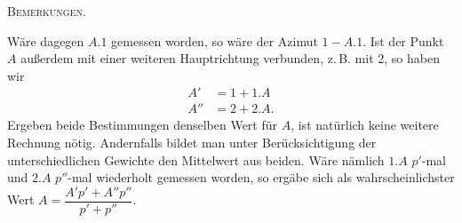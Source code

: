 \begingroup
\newcommand{\IXarc}[1]{\overset{\frown}{#1}}
\clearpage
{}\hfill\textsc{Bemerkungen.}\hfill\mbox{}\par\medskip
\noindent Wäre dagegen $A.1$ gemessen worden, so wäre der Azimut $1-A.1$. Ist der Punkt $A$ außerdem mit einer weiteren Hauptrichtung verbunden, z.\,B. mit 2, so haben wir
\[
\begin{aligned}
A'&=1+1.A\\
A''&=2+2.A.
\end{aligned}
\]
Ergeben beide Bestimmungen denselben Wert für $A$, ist natürlich keine weitere Rechnung nötig. Andernfalls bildet man unter Berücksichtigung der unterschiedlichen Gewichte den Mittelwert aus beiden. Wäre nämlich $1.A$ $p'$-mal und $2.A$ $p''$-mal wiederholt gemessen worden, so ergäbe sich als wahrscheinlichster Wert $A=\dfrac{A'p'+A''p''}{p'+p''}$.

